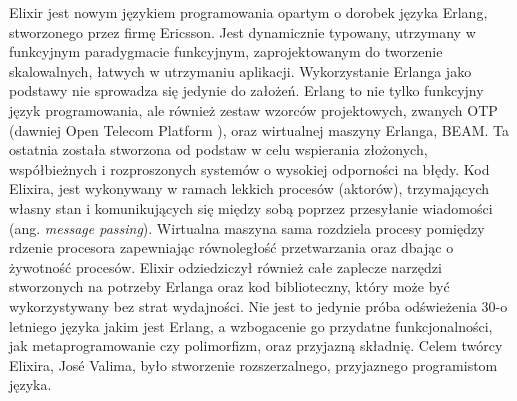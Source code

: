 Elixir jest nowym językiem programowania opartym o dorobek języka
Erlang, stworzonego przez firmę Ericsson. Jest dynamicznie typowany,
utrzymany w funkcyjnym paradygmacie funkcyjnym, zaprojektowanym do
tworzenie skalowalnych, łatwych w utrzymaniu aplikacji.
\cite{thomas2014elixir} Wykorzystanie Erlanga jako podstawy nie
sprowadza się jedynie do założeń. Erlang to nie tylko funkcyjny język
programowania, ale również zestaw wzorców projektowych, zwanych OTP
(dawniej Open Telecom Platform \cite{logan2010erlang}), oraz wirtualnej
maszyny Erlanga, BEAM. Ta ostatnia została stworzona od podstaw w celu
wspierania złożonych, współbieżnych i rozproszonych systemów o wysokiej
odporności na błędy. Kod Elixira, jest wykonywany w ramach lekkich
procesów (aktorów), trzymających własny stan i komunikujących się między
sobą poprzez przesyłanie wiadomości (ang. \emph{message passing}).
Wirtualna maszyna sama rozdziela procesy pomiędzy rdzenie procesora
zapewniając równoległość przetwarzania oraz dbając o żywotność procesów.
Elixir odziedziczył również całe zaplecze narzędzi stworzonych na
potrzeby Erlanga oraz kod biblioteczny, który może być wykorzystywany
bez strat wydajności. Nie jest to jedynie próba odświeżenia 30-o
letniego języka jakim jest Erlang, a wzbogacenie go przydatne
funkcjonalności, jak metaprogramowanie czy polimorfizm, oraz przyjazną
składnię. Celem twórcy Elixira, José Valima, było stworzenie
rozszerzalnego, przyjaznego programistom języka. \cite{valim2013design}
